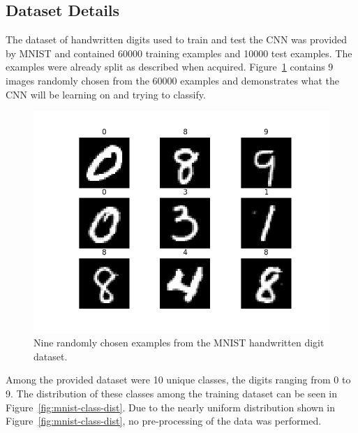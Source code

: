 \documentclass[a4paper]{article}
\begin{document}
\subsection{Dataset Details}
The dataset of handwritten digits used to train and test the CNN was provided by MNIST and contained 60000 training examples and 10000 test examples. The examples were already split as described when acquired. Figure~\ref{fig:mnist-examples} contains 9 images randomly chosen from the 60000 examples and demonstrates what the CNN will be learning on and trying to classify.

\begin{figure}[h]
    \centering
    \includegraphics[scale=0.5]{images/mnist-examples.png}
    \caption{Nine randomly chosen examples from the MNIST handwritten digit dataset.}
    \label{fig:mnist-examples}
\end{figure}

Among the provided dataset were 10 unique classes, the digits ranging from 0 to 9. The distribution of these classes among the training dataset can be seen in Figure~\ref{fig:mnist-class-dist}. Due to the nearly uniform distribution shown in Figure~\ref{fig:mnist-class-dist}, no pre-processing of the data was performed.
\end{document}
